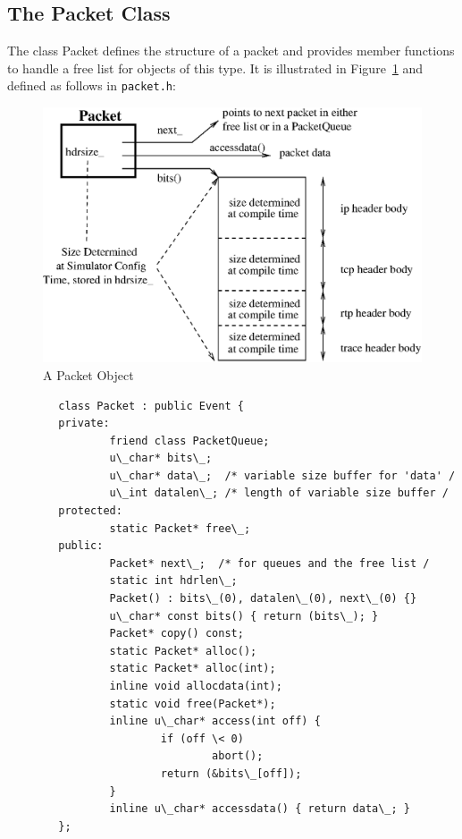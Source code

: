 \subsection{The Packet Class}
\label{sec:packetclass}

The class Packet defines the structure of a
packet and provides member functions to handle a
free list for objects of this type.
It is illustrated in Figure~\ref{pic:packet} and
defined as follows in {\tt packet.h}:
\begin{figure}[ht]
  \centerline{\includegraphics{packet}}
  \caption{A Packet Object}
  \label{pic:packet}
\end{figure}
\begin{verbatim}
        class Packet : public Event {
        private:
                friend class PacketQueue;
                u\_char* bits\_;  
                u\_char* data\_;  /* variable size buffer for 'data' /
                u\_int datalen\_; /* length of variable size buffer /
        protected:
                static Packet* free\_;
        public: 
                Packet* next\_;  /* for queues and the free list /
                static int hdrlen\_;
                Packet() : bits\_(0), datalen\_(0), next\_(0) {}
                u\_char* const bits() { return (bits\_); }
                Packet* copy() const;
                static Packet* alloc();
                static Packet* alloc(int);
                inline void allocdata(int);
                static void free(Packet*);
                inline u\_char* access(int off) {
                        if (off \< 0)
                                abort();
                        return (&bits\_[off]);
                }  
                inline u\_char* accessdata() { return data\_; }
        };
\end{verbatim}
